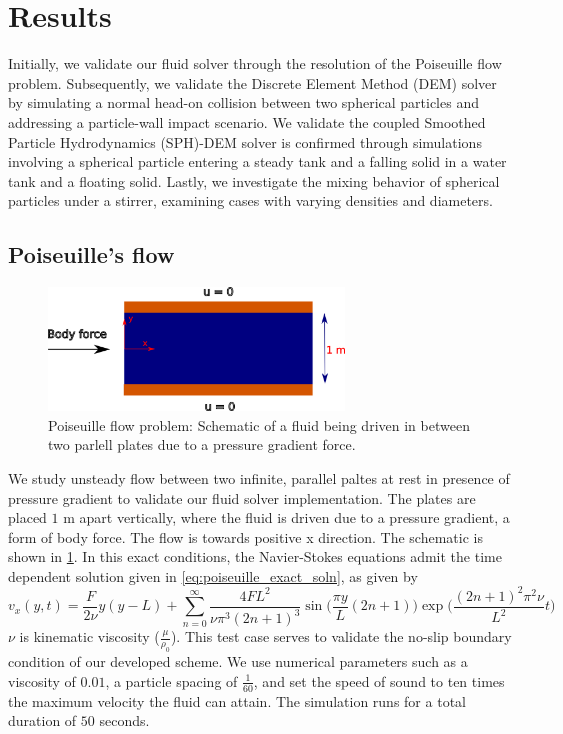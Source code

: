 \documentclass[preprint,12pt]{elsarticle}
\begin{document}
\FloatBarrier%
\section{Results}
\label{sec:results}
Initially, we validate our fluid solver through the resolution of the
Poiseuille flow problem. Subsequently, we validate the Discrete Element Method
(DEM) solver by simulating a normal head-on collision between two spherical
particles and addressing a particle-wall impact scenario. We validate the
coupled Smoothed Particle Hydrodynamics (SPH)-DEM solver is confirmed through
simulations involving a spherical particle entering a steady tank and a
falling solid in a water tank and a floating solid. Lastly, we investigate the
mixing behavior of spherical particles under a stirrer, examining cases with
varying densities and diameters.


\FloatBarrier%
\subsection{Poiseuille's flow}
\label{sec:poiseuille_flow}

\begin{figure}[!htpb]
  \centering
  \includegraphics[width=0.7\textwidth]{images/fluid_01_benchmark_poisuelle/poiseuille_schematic}
  \caption{Poiseuille flow problem: Schematic of a fluid being driven in
    between two parlell plates due to a pressure gradient force.}
  \label{fig:poiseuille_schematic}
\end{figure}
We study unsteady flow between two infinite, parallel paltes at rest in
presence of pressure gradient to validate our fluid solver implementation.
The plates are placed $1$ m apart vertically, where the fluid is driven due to
a pressure gradient, a form of body force. The flow is towards positive x
direction. The schematic is shown in \cref{fig:poiseuille_schematic}.  In this
exact conditions, the Navier-Stokes equations admit the time dependent
solution given in \cref{eq:poiseuille_exact_soln}, as given by
\citet{morris1997modeling}
\begin{equation}
  \label{eq:poiseuille_exact_soln}
  v_x(y, t) = \frac{F}{2 \nu}y(y - L) + \sum_{n=0}^{\infty}\frac{4FL^2}{\nu \pi^3 (2n + 1)^3} \sin\bigg(\frac{\pi y}{L} (2 n + 1) \bigg) \exp\bigg(\frac{ (2 n + 1)^2 \pi^2 \nu}{L^2} t\bigg)
\end{equation}
$\nu$ is kinematic viscosity ($\frac{\mu}{\rho_0}$). This test case serves to
validate the no-slip boundary condition of our developed scheme. We use
numerical parameters such as a viscosity of $0.01$, a particle spacing of
$\frac{1}{60}$, and set the speed of sound to ten times the maximum velocity
the fluid can attain. The simulation runs for a total duration of $50$
seconds.
\end{document}
